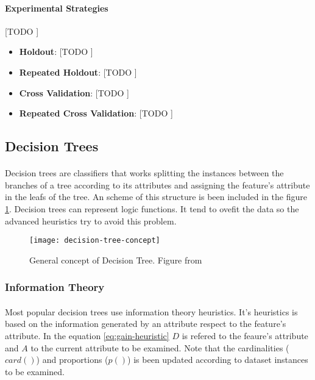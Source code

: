 \documentclass{article}
\begin{document}
		\paragraph{Experimental Strategies}
		\label{paragraph:experimental-strategies}
  	[TODO ]

		\begin{itemize}
			\item
				\textbf{Holdout}:
				[TODO ]

			\item
				\textbf{Repeated Holdout}:
				[TODO ]

			\item
				\textbf{Cross Validation}:
				[TODO ]

			\item
				\textbf{Repeated Cross Validation}:
				[TODO ]

		\end{itemize}

		\subsection{Decision Trees}
		\label{sec:decision-trees}

			\paragraph{}
			Decision trees are classifiers that works splitting the instances between the branches of a tree according to its attributes and assigning the feature's attribute in the leafs of the tree. An scheme of this structure is been included in the figure \ref{fig:decision-tree-concept}. Decision trees can represent logic functions. It tend to ovefit the data so the advanced heuristics try to avoid this problem.

			\begin{figure}
				\centering
				\texttt{[image: decision-tree-concept]}
				\caption{General concept of Decision Tree. Figure from \cite{bigml:a-new-way-to-visualize-decision-trees}}
				\label{fig:decision-tree-concept}
			\end{figure}


			\subsubsection{Information Theory}
			\label{sec:information-theory}

				\paragraph{}
				Most popular decision trees use information theory heuristics. It's heuristics is based on the information generated by an attribute respect to the feature's attribute. In the equation \eqref{eq:gain-heuristic} $D$ is refered to the feaure's attribute and $A$ to the current attribute to be examined. Note that the cardinalities ($card()$) and proportions ($p()$) is been updated according to dataset instances to be examined.
\end{document}
